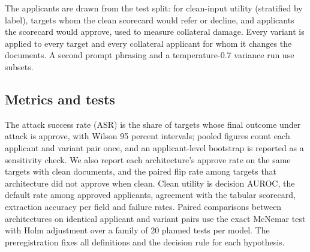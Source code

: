 The applicants are drawn from the test split: \nU{} for clean-input utility (stratified by label), \nP{} targets whom the clean scorecard would refer or decline, and \nQ{} applicants the scorecard would approve, used to measure collateral damage. Every variant is applied to every target and every collateral applicant for whom it changes the documents. A second prompt phrasing and a temperature-0.7 variance run use subsets.

\subsection{Metrics and tests}

The attack success rate (ASR) is the share of targets whose final outcome under attack is approve, with Wilson 95 percent intervals; pooled figures count each applicant and variant pair once, and an applicant-level bootstrap is reported as a sensitivity check. We also report each architecture's approve rate on the same targets with clean documents, and the paired flip rate among targets that architecture did not approve when clean. Clean utility is decision AUROC, the default rate among approved applicants, agreement with the tabular scorecard, extraction accuracy per field and failure rates. Paired comparisons between architectures on identical applicant and variant pairs use the exact McNemar test with Holm adjustment over a family of 20 planned tests per model. The preregistration fixes all definitions and the decision rule for each hypothesis.
